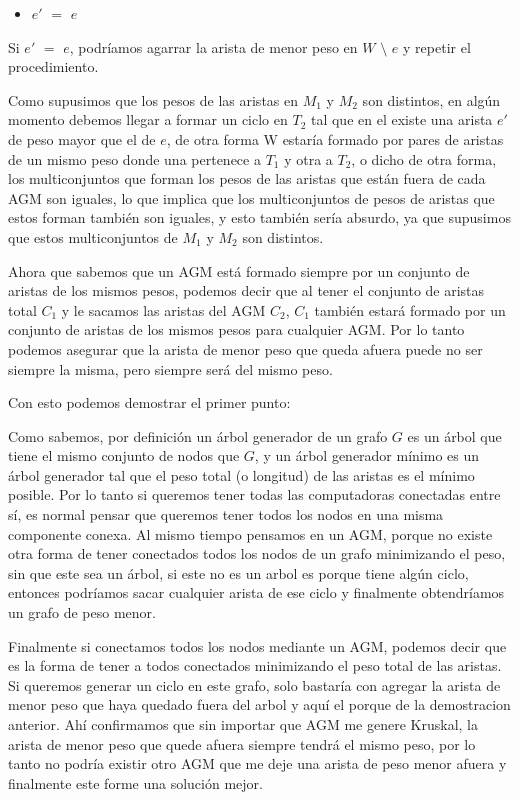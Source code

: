 \begin{itemize}
\item $e'$ $=$ $e$
\end{itemize}
Si $e'$ $=$ $e$, podr\'iamos agarrar la arista de menor peso en $W$ $\setminus$ $e$  y repetir el procedimiento.

Como supusimos que los pesos de las aristas en $M_1$ y $M_2$ son distintos, en alg\'un momento debemos llegar a formar un ciclo en $T_2$ tal que en el existe una arista $e'$ de peso mayor que el de $e$, de otra forma W estar\'ia formado por pares de aristas de un mismo peso donde una pertenece a $T_1$ y otra a $T_2$, o dicho de otra forma, los multiconjuntos que forman los pesos de las aristas que est\'an fuera de cada AGM son iguales, lo que implica que los multiconjuntos de pesos de aristas que estos forman tambi\'en son iguales, y esto tambi\'en ser\'ia absurdo, ya que supusimos que estos multiconjuntos de $M_1$ y $M_2$ son distintos.

Ahora que sabemos que un AGM est\'a formado siempre por un conjunto de aristas de los mismos pesos, podemos decir que al tener el conjunto de aristas total $C_1$ y le sacamos las aristas del AGM $C_2$, $C_1$ tambi\'en estar\'a formado por un conjunto de aristas de los mismos pesos para cualquier AGM. Por lo tanto podemos asegurar que la arista de menor peso que queda afuera puede no ser siempre la misma, pero siempre ser\'a del mismo peso.

Con esto podemos demostrar el primer punto:

Como sabemos, por definici\'on un \'arbol generador de un grafo $G$ es un \'arbol que tiene el mismo conjunto de nodos que $G$, y un \'arbol generador mínimo es un \'arbol generador tal que el peso total (o longitud) de las aristas es el mínimo posible.
Por lo tanto si queremos tener todas las computadoras conectadas entre s\'i, es normal pensar que queremos tener todos los nodos en una misma componente conexa.
Al mismo tiempo pensamos en un AGM, porque no existe otra forma de tener conectados todos los nodos de un grafo minimizando el peso, sin que este sea un \'arbol, si este no es un arbol es porque tiene alg\'un ciclo, entonces podr\'iamos sacar cualquier arista de ese ciclo y finalmente obtendr\'iamos un grafo de peso menor.

Finalmente si conectamos todos los nodos mediante un AGM, podemos decir que es la forma de tener a todos conectados minimizando el peso total de las aristas. Si queremos generar un ciclo en este grafo, solo bastaría con agregar la arista de menor peso que haya quedado fuera del arbol y aquí el porque de la demostracion anterior. Ahí confirmamos que sin importar que AGM me genere Kruskal, la arista de menor peso que quede afuera siempre tendr\'a el mismo peso, por lo tanto no podr\'ia existir otro AGM que me deje una arista de peso menor afuera y finalmente este forme una soluci\'on mejor.


